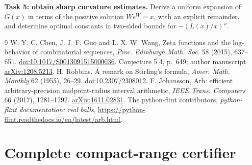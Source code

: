 \documentclass[10pt]{article}
\begin{document}
\medskip
\noindent\textbf{Task 5: obtain sharp curvature estimates.}
Derive a uniform expansion of $G(x)$ in terms of the positive solution
$W e^W=x$, with an explicit remainder, and determine optimal constants
in two-sided bounds for $-(L(x)/x)''$.

\begin{thebibliography}{9}
W. Y. C. Chen, J. J. F. Guo and L. X. W. Wang,
Zeta functions and the log-behavior of combinatorial sequences,
\emph{Proc. Edinburgh Math. Soc.} 58 (2015), 637--651.
\href{https://doi.org/10.1017/S0013091515000036}{doi:10.1017/S0013091515000036}.
Conjecture 5.4, p.~649; author manuscript
\href{https://arxiv.org/abs/1208.5213}{arXiv:1208.5213}.
H. Robbins, A remark on Stirling's formula,
\emph{Amer. Math. Monthly} 62 (1955), 26--29.
\href{https://doi.org/10.2307/2308012}{doi:10.2307/2308012}.
F. Johansson, Arb: efficient arbitrary-precision midpoint-radius
interval arithmetic, \emph{IEEE Trans. Computers} 66 (2017), 1281--1292.
\href{https://arxiv.org/abs/1611.02831}{arXiv:1611.02831}.
The python-flint contributors,
\emph{python-flint documentation: real balls},
\url{https://python-flint.readthedocs.io/en/latest/arb.html}.
\end{thebibliography}

\clearpage
\appendix
\section{Complete compact-range certifier}

\end{document}
